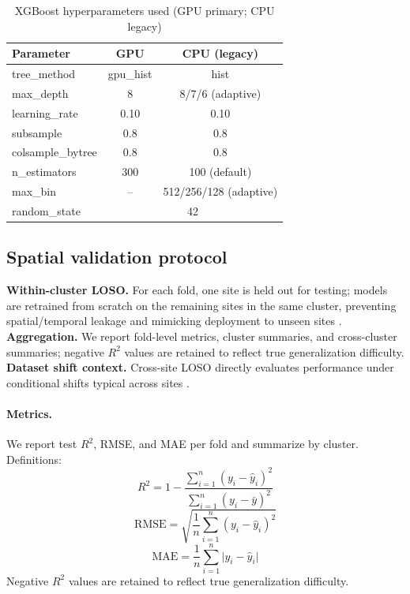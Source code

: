 \documentclass[graybox]{svmult}
\begin{document}
\begin{table}[ht]
  \centering
\caption{XGBoost hyperparameters used (GPU primary; CPU legacy)}
\begin{tabular}{lcc}
\hline
Parameter & GPU & CPU (legacy) \\
\hline
tree\_method & gpu\_hist & hist \\
max\_depth & 8 & 8/7/6 (adaptive) \\
learning\_rate & 0.10 & 0.10 \\
subsample & 0.8 & 0.8 \\
colsample\_bytree & 0.8 & 0.8 \\
n\_estimators & 300 & 100 (default) \\
max\_bin & -- & 512/256/128 (adaptive) \\
random\_state & \multicolumn{2}{c}{42} \\
\hline
\end{tabular}
\end{table}

\subsection{Spatial validation protocol}
\label{subsec:validation}
\textbf{Within-cluster LOSO.} For each fold, one site is held out for testing; models are retrained from scratch on the remaining sites in the same cluster, preventing spatial/temporal leakage and mimicking deployment to unseen sites \cite{roberts_crossvalidation_2017}. \\
\textbf{Aggregation.} We report fold-level metrics, cluster summaries, and cross-cluster summaries; negative $R^2$ values are retained to reflect true generalization difficulty. \\
\textbf{Dataset shift context.} Cross-site LOSO directly evaluates performance under conditional shifts typical across sites \cite{moreno-torres_unifying_2012, quinonero-candela_dataset_2009}.

\paragraph{Metrics.}
We report test $R^2$, RMSE, and MAE per fold and summarize by cluster. Definitions:
\[
R^2 = 1 - \frac{\sum_{i=1}^{n} (y_i - \hat{y}_i)^2}{\sum_{i=1}^{n} (y_i - \bar{y})^2}
\]
\[
\mathrm{RMSE} = \sqrt{\frac{1}{n}\sum_{i=1}^{n} (y_i - \hat{y}_i)^2}
\]
\[
\mathrm{MAE} = \frac{1}{n}\sum_{i=1}^{n} \lvert y_i - \hat{y}_i \rvert
\]
Negative $R^2$ values are retained to reflect true generalization difficulty.
\end{document}
